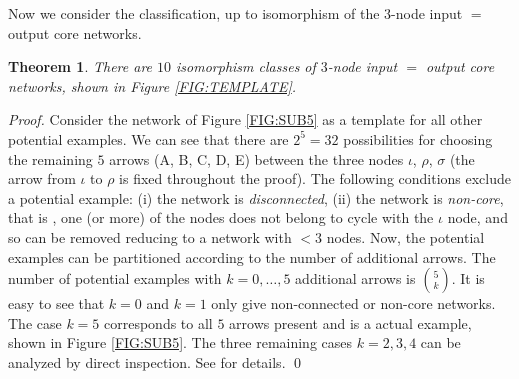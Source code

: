 \documentclass[a4paper,fleqn]{cas-dc}
\newtheorem{theorem}{Theorem}[section]
\begin{document}
Now we consider the classification, up to isomorphism of the $3$-node input $=$ output core networks.

\begin{theorem}
There are $10$ isomorphism classes of $3$-node input $=$ output core networks, shown in Figure \ref{FIG:TEMPLATE}.
\end{theorem}
\begin{proof}
Consider the network of Figure \ref{FIG:SUB5} as a template for all other potential examples.
We can see that there are $2^5=32$ possibilities for choosing the remaining $5$ arrows (A, B, C, D, E) between the three nodes $\iota$, $\rho$, $\sigma$ (the arrow from $\iota$ to $\rho$ is fixed throughout the proof).
The following conditions exclude a potential example: (i) the network is \emph{disconnected}, (ii) the network is \emph{non-core}, that is , one (or more) of the nodes does not belong to cycle with the $\iota$ node, and so can be removed reducing to a network with $<3$ nodes.
Now, the potential examples can be partitioned according to the number of additional arrows. 
The number of potential examples with $k=0,\ldots,5$ additional arrows is $\binom{5}{k}$.
It is easy to see that $k=0$ and $k=1$ only give non-connected or non-core networks. The case $k=5$ corresponds to all $5$ arrows present and is a actual example, shown in  Figure \ref{FIG:SUB5}.
The three remaining cases $k=2,3,4$ can be analyzed by direct inspection.
See \cite{antoneli2024} for details.
\qed
\end{proof}
\end{document}
